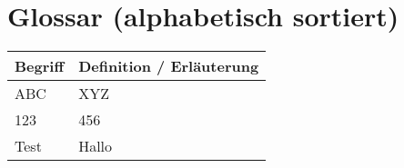 {}
\section*{Glossar (alphabetisch sortiert)}
\begin{tabular}{|p{}|p{}|}
    \hline
    \rowcolor{gray!30}
    Begriff & Definition / Erläuterung \\
    \hline
    ABC & XYZ \\
    \hline
    123 & 456 \\
    \hline
    Test & Hallo \\
    \hline
\end{tabular}
